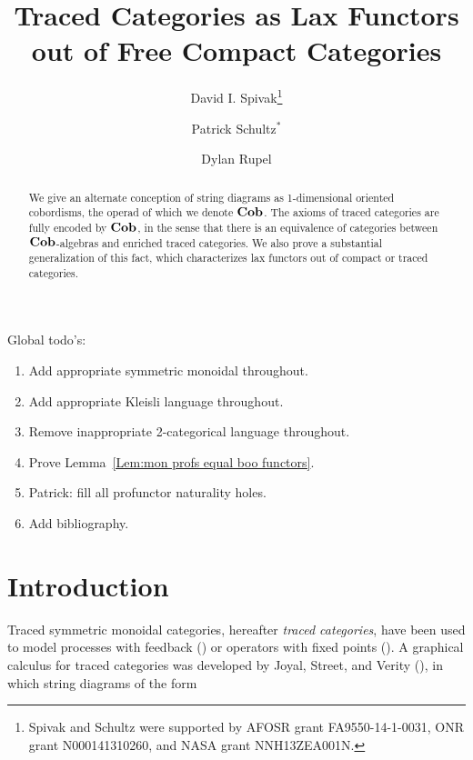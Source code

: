 \documentclass[12pt,oneside,article,draft]{memoir}
\title{Traced Categories as Lax Functors out of Free Compact Categories}
\author{
David I. Spivak\thanks{Spivak and Schultz were supported by AFOSR grant FA9550-14-1-0031, ONR grant N000141310260, and NASA grant NNH13ZEA001N.}
 \and 
 Patrick Schultz${}^*$%
 \and
 Dylan Rupel 
 }
\begin{document}
\tightlists
\firmlists

\maketitle
\begin{abstract}
We give an alternate conception of string diagrams as 1-dimensional oriented cobordisms, the operad of which we denote $\mathbf{Cob}$. The axioms of traced categories are fully encoded by $\mathbf{Cob}$, in the sense that there is an equivalence of categories between $\mathbf{Cob}$-algebras and enriched traced categories. We also prove a substantial generalization of this fact, which characterizes lax functors out of compact or traced categories.
\end{abstract}
Global todo's:
\begin{enumerate}
\item Add appropriate symmetric monoidal throughout.
\item Add appropriate Kleisli language throughout.
\item Remove inappropriate 2-categorical language throughout.
\item Prove Lemma~\ref{Lem:mon profs equal boo functors}.
\item Patrick: fill all profunctor naturality holes.
\item Add bibliography.
\end{enumerate}


\setcounter{tocdepth}{1}
\tableofcontents*


\chapter{Introduction}

Traced symmetric monoidal categories, hereafter \emph{traced categories}, have been used to model processes with feedback (\cite{http://arxiv.org/pdf/1401.5113v1.pdf})  or operators with fixed points (\cite{http://arxiv.org/pdf/1107.6032.pdf}). A graphical calculus for traced categories was developed by Joyal, Street, and Verity (\cite{JoyalStreetVerity}), in which string diagrams of the form
\end{document}
